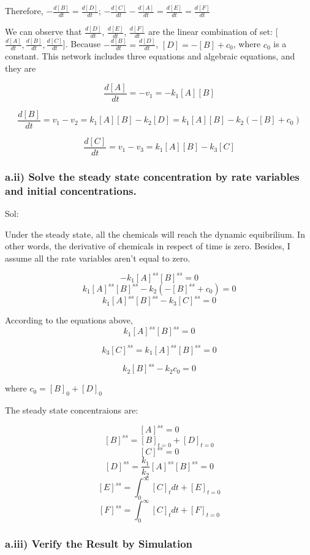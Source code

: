 \documentclass[11pt]{article}
\begin{document}
    Therefore, \(-\frac{d[B]}{dt}=\frac{d[D]}{dt}\);
\(-\frac{d[C]}{dt}-\frac{d[A]}{dt}=\frac{d[E]}{dt}=\frac{d[F]}{dt}\)

    We can observe that \(\frac{d[D]}{dt}\), \(\frac{d[E]}{dt}\),
\(\frac{d[F]}{dt}\) are the linear combination of set:
{[}\(\frac{d[A]}{dt},\frac{d[B]}{dt}, \frac{d[C]}{dt}\){]}. Because
\(-\frac{d[B]}{dt}=\frac{d[D]}{dt}\), \([D] = -[B]+c_{0}\), where
\(c_{0}\) is a constant. This network includes three equations and
algebraic equations, and they are

    \[\frac{d[A]}{dt}=-v_{1}=-k_{1}[A][B]\]

\[\frac{d[B]}{dt}=v_{1}-v_{2}=k_{1}[A][B]-k_{2}[D]=k_{1}[A][B]-k_{2}(-[B]+c_{0})\]

\[\frac{d[C]}{dt}=v_{1}-v_{3}=k_{1}[A][B]-k_{3}[C]\]

    \subsubsection{a.ii) Solve the steady state concentration by rate
variables and initial
concentrations.}\label{a.ii-solve-the-steady-state-concentration-by-rate-variables-and-initial-concentrations.}

    Sol:

Under the steady state, all the chemicals will reach the dynamic
equibrilium. In other words, the derivative of chemicals in respect of
time is zero. Besides, I assume all the rate variables aren't equal to
zero.

\[-k_{1}[A]^{ss}[B]^{ss}=0 \]
\[k_{1}[A]^{ss}[B]^{ss}-k_{2}(-[B]^{ss}+c_{0})=0 \]
\[k_{1}[A]^{ss}[B]^{ss}-k_{3}[C]^{ss}=0 \]

    According to the equations above, \[k_{1}[A]^{ss}[B]^{ss}=0\]

\[k_{3}[C]^{ss}=k_{1}[A]^{ss}[B]^{ss}=0\]

\[k_{2}[B]^{ss}-k_{2}c_{0}=0\]

    where \(c_{0}=[B]_{0}+[D]_{0}\)

    The steady state concentraions are:

\[[A]^{ss}=0 \] \[[B]^{ss}=[B]_{t=0}+[D]_{t=0} \] \[[C]^{ss}=0 \]
\[[D]^{ss}=\frac{k_1}{k_2}[A]^{ss}[B]^{ss}=0 \]
\[[E]^{ss}=\int_{0}^{\infty}[C]_{t}dt+[E]_{t=0} \]
\[[F]^{ss}=\int_{0}^{\infty}[C]_{t}dt+[F]_{t=0} \]

    \subsubsection{a.iii) Verify the Result by
Simulation}\label{a.iii-verify-the-result-by-simulation}
\end{document}
